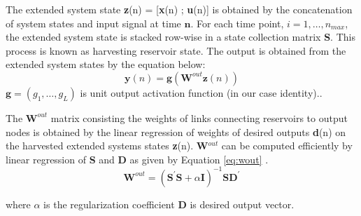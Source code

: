 
 The extended system state \textbf{z}(n) = [\textbf{x}(n) ; \textbf{u}(n)] is obtained 
 by the concatenation of system states and input signal at time $\mathbf{n}$. For each time point, $i = 1,\hdots ,n_{max}$, the extended system state is stacked row-wise in a state collection matrix \textbf{S}. This process is known as harvesting reservoir state. The output is 
 obtained from the extended system states by the equation below:
 \begin{equation} \label{eq:prediction}
   \mathbf{y}(n) = \mathbf{g}(\mathbf{W}^{out} \mathbf{z}(n) )
 \end{equation}
   $\mathbf{g} = (g_1, \hdots,g_L)$ is unit output activation function (in our case identity).\cite{Jaeger:2007}.
  
   The $\textbf{W}^{out}$ matrix consisting the weights of links connecting reservoirs to output nodes is obtained by the linear 
   regression of weights of desired outputs \textbf{d}(n) on the harvested 
   extended systems states \textbf{z}(n). \textbf{W}$^{out}$ can be computed 
   efficiently by linear regression of \textbf{S} and \textbf{D} as given by Equation \eqref{eq:wout} .
   \begin{equation}\label{eq:wout}
 	\mathbf{W}^{out} =
      (\mathbf{S^{'}S} + \alpha \mathbf{I})^{-1}\mathbf{SD}^{'}
      \end{equation}
     
      where $\alpha$ is the regularization coefficient \textbf{D} is 
      desired output vector\cite{Jaeger:2007}.
